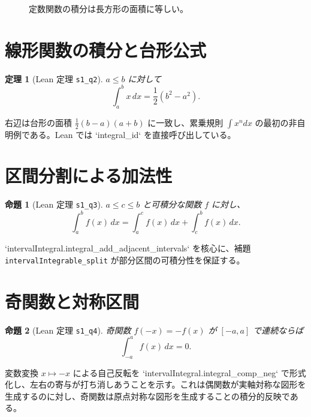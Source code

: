 \documentclass[luatex]{ltjsarticle}
\theoremstyle{definition}
\theoremstyle{plain}
\newtheorem{theorem}{定理}
\newtheorem{proposition}{命題}
\theoremstyle{remark}
\begin{document}
\begin{figure}[h]
\centering
{}
\caption{定数関数の積分は長方形の面積に等しい。}
\end{figure}

\section{線形関数の積分と台形公式}

\begin{theorem}[Lean 定理 \texttt{s1\_q2}]
\label{thm:s1q2}
\(a\le b\) に対して
\[
\int_a^b x\,dx = \frac{1}{2}(b^2-a^2).
\]
\end{theorem}

右辺は台形の面積 \(\tfrac{1}{2}(b-a)(a+b)\) に一致し、累乗規則 \(\int x^n dx\) の最初の非自明例である。Lean では `integral_id` を直接呼び出している。

\section{区間分割による加法性}
\begin{proposition}[Lean 定理 \texttt{s1\_q3}]
\label{prop:s1q3}
\(a\le c\le b\) と可積分な関数 \(f\) に対し、
\[
\int_a^b f(x)\,dx = \int_a^c f(x)\,dx + \int_c^b f(x)\,dx.
\]
\end{proposition}

`intervalIntegral.integral_add_adjacent_intervals` を核心に、補題 \texttt{intervalIntegrable\_split} が部分区間の可積分性を保証する。

\section{奇関数と対称区間}
\begin{proposition}[Lean 定理 \texttt{s1\_q4}]
\label{prop:s1q4}
奇関数 \(f(-x)=-f(x)\) が \([-a,a]\) で連続ならば
\[
\int_{-a}^{a} f(x)\,dx = 0.
\]
\end{proposition}

変数変換 \(x\mapsto -x\) による自己反転を `intervalIntegral.integral_comp_neg` で形式化し、左右の寄与が打ち消しあうことを示す。これは偶関数が実軸対称な図形を生成するのに対し、奇関数は原点対称な図形を生成することの積分的反映である。
\end{document}
